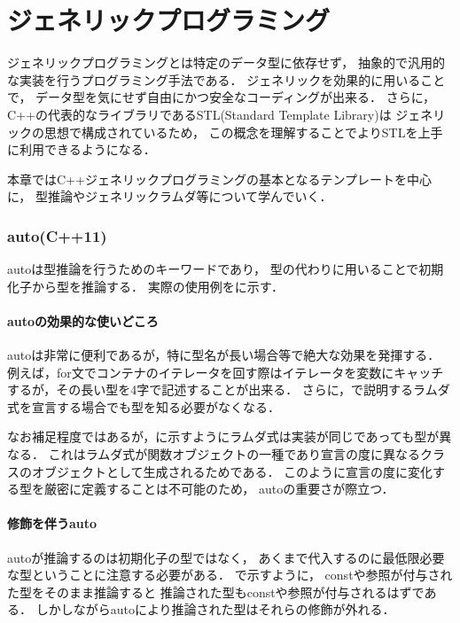 
\part{ジェネリックプログラミング}
ジェネリックプログラミングとは特定のデータ型に依存せず，
抽象的で汎用的な実装を行うプログラミング手法である．
ジェネリックを効果的に用いることで，
データ型を気にせず自由にかつ安全なコーディングが出来る．
さらに，C++の代表的なライブラリであるSTL(Standard Template Library)は
ジェネリックの思想で構成されているため，
この概念を理解することでよりSTLを上手に利用できるようになる．

本章ではC++ジェネリックプログラミングの基本となるテンプレートを中心に，
型推論やジェネリックラムダ等について学んでいく．

\section{auto(C++11)}
autoは型推論を行うためのキーワードであり，
型の代わりに用いることで初期化子から型を推論する．
実際の使用例をに示す．


\subsection{autoの効果的な使いどころ}
autoは非常に便利であるが，特に型名が長い場合等で絶大な効果を発揮する．
例えば，for文でコンテナのイテレータを回す際はイテレータを変数にキャッチするが，その長い型を4字で記述することが出来る．
さらに，で説明するラムダ式を宣言する場合でも型を知る必要がなくなる．


なお補足程度ではあるが，に示すようにラムダ式は実装が同じであっても型が異なる．
これはラムダ式が関数オブジェクトの一種であり宣言の度に異なるクラスのオブジェクトとして生成されるためである．
このように宣言の度に変化する型を厳密に定義することは不可能のため，
autoの重要さが際立つ．


\subsection{修飾を伴うauto}
autoが推論するのは初期化子の型ではなく，
あくまで代入するのに最低限必要な型ということに注意する必要がある．
で示すように，
constや参照が付与された型をそのまま推論すると
推論された型もconstや参照が付与されるはずである．
しかしながらautoにより推論された型はそれらの修飾が外れる．

